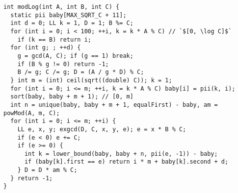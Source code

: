 \begin{lstlisting}
int modLog(int A, int B, int C) {
  static pii baby[MAX_SQRT_C + 11];
  int d = 0; LL k = 1, D = 1; B %= C;
  for (int i = 0; i < 100; ++i, k = k * A % C) // `$[0, \log C]$`
    if (k == B) return i;
  for (int g; ; ++d) {
    g = gcd(A, C); if (g == 1) break;
    if (B % g != 0) return -1;
    B /= g; C /= g; D = (A / g * D) % C;
  } int m = (int) ceil(sqrt((double) C)); k = 1;
  for (int i = 0; i <= m; ++i, k = k * A % C) baby[i] = pii(k, i);
  sort(baby, baby + m + 1); // [0, m]
  int n = unique(baby, baby + m + 1, equalFirst) - baby, am = powMod(A, m, C);
  for (int i = 0; i <= m; ++i) {
    LL e, x, y; exgcd(D, C, x, y, e); e = x * B % C;
    if (e < 0) e += C;
    if (e >= 0) {
      int k = lower_bound(baby, baby + n, pii(e, -1)) - baby;
      if (baby[k].first == e) return i * m + baby[k].second + d;
    } D = D * am % C;
  } return -1;
}
\end{lstlisting}